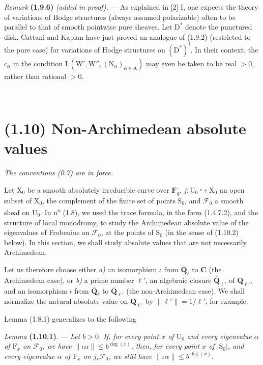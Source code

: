 \documentclass[11pt,leqno]{article}
\newcommand{\Page}[1]{\ifvmode\noindent\else\unskip\ \fi{\footnotesize\textcolor{gray}{[p.\,#1]}}\ \ignorespaces}
\begin{document}
\textit{Remark} \textbf{(1.9.6)} \textit{(added in proof)}. — As explained in [2] I, one expects the theory of variations of Hodge structures (always assumed polarizable) often to be parallel to that of smooth pointwise pure sheaves. Let \(\mathrm{D}^*\) denote the punctured disk. Cattani and Kaplan have just proved an analogue of (1.9.2) (restricted to the pure case) for variations of Hodge structures on \((\mathrm{D}^*)^{\mathrm{I}}\). In their context, the \(c_\alpha\) in the condition \(\mathrm{L}(\mathrm{W}',\mathrm{W}'',(\mathrm{N}_\alpha)_{\alpha\in\mathrm{A}})\) may even be taken to be real \(>0\), rather than rational \(>0\).

\Page{182}
\section*{(1.10) Non-Archimedean absolute values}

\textit{The conventions \textup{(0.7)} are in force.}

Let \(\mathrm{X}_0\) be a smooth absolutely irreducible curve over \(\mathbf{F}_q\), \(j:\mathrm{U}_0\hookrightarrow\mathrm{X}_0\) an open subset of \(\mathrm{X}_0\), the complement of the finite set of points \(\mathrm{S}_0\), and \(\mathscr{F}_0\) a smooth sheaf on \(\mathrm{U}_0\). In n\textsuperscript{o} (1.8), we used the trace formula, in the form (1.4.7.2), and the structure of local monodromy, to study the Archimedean absolute value of the eigenvalues of Frobenius on \(\mathscr{F}_0\), at the points of \(\mathrm{S}_0\) (in the sense of (1.10.2) below). In this section, we shall study absolute values that are not necessarily Archimedean.

Let us therefore choose either \textit{a)} an isomorphism \(\iota\) from \(\overline{\mathbf{Q}}_\ell\) to \(\mathbf{C}\) (the Archimedean case), or \textit{b)} a prime number \(\ell'\), an algebraic closure \(\overline{\mathbf{Q}}_{\ell'}\) of \(\mathbf{Q}_{\ell'}\), and an isomorphism \(\iota\) from \(\overline{\mathbf{Q}}_\ell\) to \(\overline{\mathbf{Q}}_{\ell'}\) (the non-Archimedean case). We shall normalize the natural absolute value on \(\overline{\mathbf{Q}}_{\ell'}\) by \(\lVert\ell'\rVert=1/\ell'\), for example.

Lemma (1.8.1) generalizes to the following

\textit{Lemma} \textbf{(1.10.1)}. — \textit{Let \(b>0\). If, for every point \(x\) of \(\mathrm{U}_0\) and every eigenvalue \(\alpha\) of \(\mathrm{F}_x\) on \(\mathscr{F}_0\), we have \(\lVert\iota\alpha\rVert\leq b^{\deg(x)}\), then, for every point \(x\) of \(\lvert\mathrm{S}_0\rvert\), and every eigenvalue \(\alpha\) of \(\mathrm{F}_x\) on \(j_*\mathscr{F}_0\), we still have \(\lVert\iota\alpha\rVert\leq b^{\deg(x)}\).}
\end{document}
